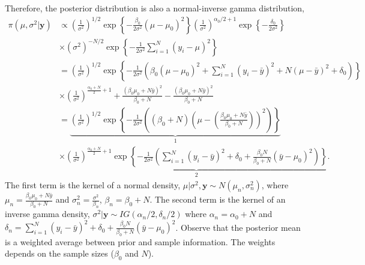 \begin{enumerate}
Therefore, the posterior distribution is also a normal-inverse gamma distribution,
{\footnotesize{
\begin{align}
	\pi(\mu,\sigma^2|\bm{y})&\propto \left(\frac{1}{\sigma^2}\right)^{1/2}\exp\left\{-\frac{\beta_0}{2\sigma^2}(\mu-\mu_0)^2\right\}\left(\frac{1}{\sigma^2}\right)^{\alpha_0/2+1}\exp\left\{-\frac{\delta_0}{2\sigma^2}\right\}\nonumber\\
	&\times(\sigma^2)^{-N/2}\exp\left\{-\frac{1}{2\sigma^2}\sum_{i=1}^N (y_i-\mu)^2\right\}\nonumber\\
	& = \left(\frac{1}{\sigma^2}\right)^{1/2}\exp\left\{-\frac{1}{2\sigma^2}\left(\beta_0(\mu-\mu_0)^2+\sum_{i=1}^N (y_i-\bar{y})^2+N(\mu-\bar{y})^2+\delta_0\right)\right\}\nonumber\\
	& \times\left(\frac{1}{\sigma^2}\right)^{\frac{\alpha_0+N}{2}+1} + \frac{(\beta_0\mu_0+N\bar{y})^2}{\beta_0+N} - \frac{(\beta_0\mu_0+N\bar{y})^2}{\beta_0+N}\nonumber\\
	& = \underbrace{\left(\frac{1}{\sigma^2}\right)^{1/2}\exp\left\{-\frac{1}{2\sigma^2}\left((\beta_0+N)\left(\mu-\left(\frac{\beta_0\mu_0+N\bar{y}}{\beta_0+N}\right)\right)^2\right)\right\}}_{1}\nonumber\\
	& \times \underbrace{\left(\frac{1}{\sigma^2}\right)^{\frac{\alpha_0+N}{2}+1}\exp\left\{-\frac{1}{2\sigma^2}\left(\sum_{i=1}^N (y_i-\bar{y})^2+\delta_0+\frac{\beta_0N}{\beta_0+N}(\bar{y}-\mu_0)^2\right)\right\}}_{2}.\nonumber
\end{align}
}}
The first term is the kernel of a normal density, $\mu|\sigma^2,\bm{y}\sim N \left(\mu_n, \sigma_n^2\right)$, where $\mu_n=\frac{\beta_0\mu_0+N\bar{y}}{\beta_0+N}$ and $\sigma_n^2=\frac{\sigma^2}{\beta_n}$, $\beta_n=\beta_0+N$. The second term is the kernel of an inverse gamma density, $\sigma^2|\bm{y}\sim IG(\alpha_n/2,\delta_n/2)$ where $\alpha_n=\alpha_0+N$ and $\delta_n=\sum_{i=1}^N (y_i-\bar{y})^2+\delta_0+\frac{\beta_0N}{\beta_0+N}(\bar{y}-\mu_0)^2$. Observe that the posterior mean is a weighted average between prior and sample information. The weights depends on the sample sizes ($\beta_0$ and $N$).


\end{enumerate}
